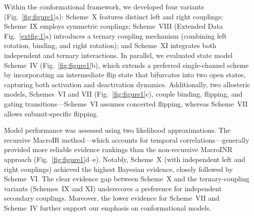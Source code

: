 \documentclass[pdflatex,sn-nature]{sn-jnl}%
\theoremstyle{thmstyleone}%
\theoremstyle{thmstyletwo}%
\theoremstyle{thmstylethree}%
\begin{document}
Within the conformational framework, we developed four variants (Fig.~\ref{fig:figure1}a): Scheme~X features distinct left and right couplings; Scheme~IX employs symmetric couplings; Scheme~VIII (Extended Data Fig.~\ref{extfig:1}a) introduces a ternary coupling mechanism (combining left rotation, binding, and right rotation); and Scheme~XI integrates both independent and ternary interactions. In parallel, we evaluated state model Scheme~IV (Fig.~\ref{fig:figure1}b), which extends a preferred single-channel scheme by incorporating an intermediate flip state that bifurcates into two open states, capturing both activation and deactivation dynamics. Additionally, two allosteric models, Schemes~VI and VII (Fig.~\ref{fig:figure1}c), couple binding, flipping, and gating transitions—Scheme~VI assumes concerted flipping, whereas Scheme~VII allows subunit-specific flipping.

Model performance was assessed using two likelihood approximations. The recursive MacroIR method—which accounts for temporal correlations—generally provided more reliable evidence rankings than the non-recursive MacroINR approach (Fig.~\ref{fig:figure1}d–e). Notably, Scheme~X (with independent left and right couplings) achieved the highest Bayesian evidence, closely followed by Scheme~VI. The clear evidence gap between Scheme~X and the ternary-coupling variants (Schemes~IX and XI) underscores a preference for independent secondary couplings. Moreover, the lower evidence for Scheme~VII and Scheme~IV further support our emphasis on conformational models.
\end{document}
